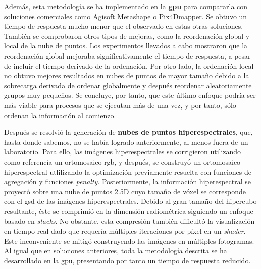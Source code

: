 Además, esta metodología se ha implementado en la \textbf{\acrshort{gpu}} para compararla con soluciones comerciales como Agisoft Metashape o Pix4Dmapper. Se obtuvo un tiempo de respuesta mucho menor que el observado en estas otras soluciones. También se comprobaron otros tipos de mejoras, como la reordenación global y local de la nube de puntos. Los experimentos llevados a cabo mostraron que la reordenación global mejoraba significativamente el tiempo de respuesta, a pesar de incluir el tiempo derivado de la ordenación. Por otro lado, la ordenación local no obtuvo mejores resultados en nubes de puntos de mayor tamaño debido a la sobrecarga derivada de ordenar globalmente y después reordenar aleatoriamente grupos muy pequeños. Se concluye, por tanto, que este último enfoque podría ser más viable para procesos que se ejecutan más de una vez, y por tanto, sólo ordenan la información al comienzo.

Después se resolvió la generación de \textbf{nubes de puntos hiperespectrales}, que, hasta donde sabemos, no se había logrado anteriormente, al menos fuera de un laboratorio. Para ello, las imágenes hiperespectrales se corrigieron utilizando como referencia un ortomosaico \acrshort{rgb}, y después, se construyó un ortomosaico hiperespectral utlilizando la optimización previamente resuelta con funciones de agregación y funciones \textit{penalty}. Posteriormente, la información hiperespectral se proyectó sobre una nube de puntos 2.5D cuyo tamaño de vóxel se corresponde con el \acrshort{gsd} de las imágenes hiperespectrales. Debido al gran tamaño del hipercubo resultante, éste se comprimió en la dimensión radiométrica siguiendo un enfoque basado en \textit{stacks}. No obstante, esta compresión también dificultó la visualización en tiempo real dado que requería múltiples iteraciones por píxel en un \textit{shader}. Este inconveniente se mitigó construyendo las imágenes en múltiples fotogramas. Al igual que en soluciones anteriores, toda la metodología descrita se ha desarrollado en la \acrshort{gpu}, presentando por tanto un tiempo de respuesta reducido.

